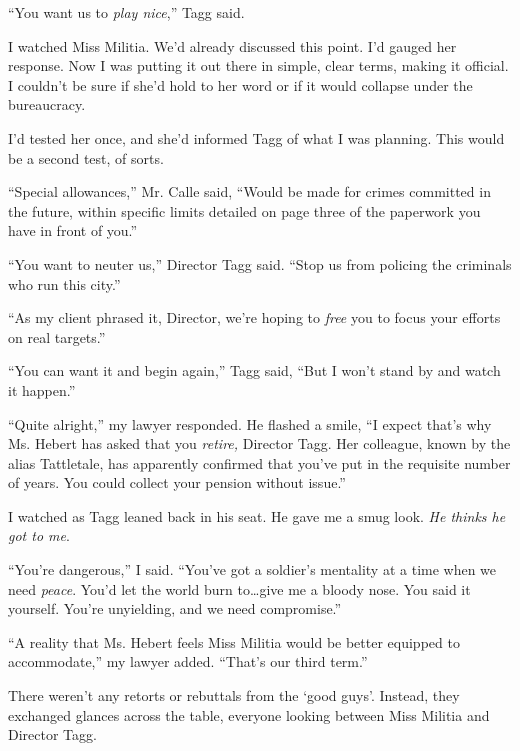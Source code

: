 ``You want us to \emph{play nice},'' Tagg said.



I watched Miss Militia.  We'd already discussed this point.  I'd gauged her response.  Now I was putting it out there in simple, clear terms, making it official.  I couldn't be sure if she'd hold to her word or if it would collapse under the bureaucracy.



I'd tested her once, and she'd informed Tagg of what I was planning.  This would be a second test, of sorts.



``Special allowances,'' Mr. Calle said, ``Would be made for crimes committed in the future, within specific limits detailed on page three of the paperwork you have in front of you.''



``You want to neuter us,'' Director Tagg said.  ``Stop us from policing the criminals who run this city.''



``As my client phrased it, Director, we're hoping to \emph{free} you to focus your efforts on real targets.''



``You can want it and begin again,'' Tagg said, ``But I won't stand by and watch it happen.''



``Quite alright,'' my lawyer responded.  He flashed a smile, ``I expect that's why Ms. Hebert has asked that you\emph{ retire, }Director Tagg.  Her colleague, known by the alias Tattletale, has apparently confirmed that you've put in the requisite number of years.  You could collect your pension without issue.''



I watched as Tagg leaned back in his seat.  He gave me a smug look.  \emph{He thinks he got to me}.



``You're dangerous,'' I said.  ``You've got a soldier's mentality at a time when we need \emph{peace}.  You'd let the world burn to\ldots give me a bloody nose.  You said it yourself.  You're unyielding, and we need compromise.''



``A reality that Ms. Hebert feels Miss Militia would be better equipped to accommodate,'' my lawyer added.  ``That's our third term.''



There weren't any retorts or rebuttals from the `good guys'.  Instead, they exchanged glances across the table, everyone looking between Miss Militia and Director Tagg.



